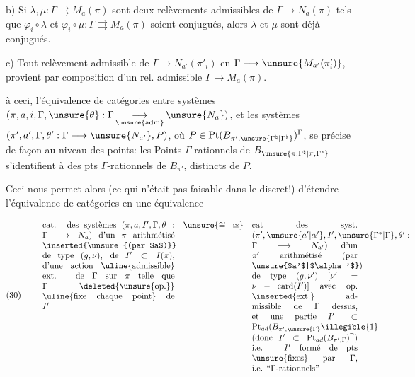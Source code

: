 b) Si $\lambda,\mu:\Gamma\rightrightarrows M_a(\pi)$ sont deux
relèvements admissibles de $\Gamma\longrightarrow N_a(\pi)$
 tels que
$\varphi_i\circ\lambda$ et $\varphi_i\circ\mu:
\Gamma\rightrightarrows M_a(\pi)$ soient
conjugués, alors $\lambda$ et $\mu$ sont déjà
\inserted{$\pi$-}conjugués.

c) Tout relèvement admissible de
$\Gamma\longrightarrow N_{a'}(\pi'_i)$ en
$\Gamma\longrightarrow \unsure{M_{a'}(\pi'_i)}$,
provient par composition d'un rel. admissible
$\Gamma\longrightarrow M_a(\pi)$.


 à ceci, l'équivalence de catégories entre systèmes
$(\pi,a,i,\Gamma,\unsure{\theta}:\Gamma\mathop{\longrightarrow}\limits_{\unsure{\mathrm{adm}}}\unsure{N_a})$,
et les systèmes $(\pi',a',\Gamma,\theta':\Gamma\longrightarrow\unsure{N_{a'}},P)$,
où $P\in\mathrm{Pt}(B_{\pi',\unsure{\Gamma^{\natural}|\Gamma^{\flat}}})^\Gamma$,
se précise de façon  au niveau des points: les
Points $\Gamma$-rationnels de $B_{\unsure{\pi,\Gamma^{\natural}|\pi,\Gamma^{\flat}}}$
s'identifient à 
 des pts $\Gamma$-rationnels
de $B_{\pi'}$, distincts de $P$.

Ceci nous permet alors (ce qui n'était pas faisable dans le 
discret!) d'étendre l'équivalence de catégories en une équivalence

\[
(30)\qquad
\begin{array}{c@{\quad}c@{\quad}c}
\parbox[t]{0.45\linewidth}{%
cat. des systèmes $(\pi,a,I',\Gamma,\theta:\Gamma\longrightarrow N_a)$
d'un $\pi$ arithmétisé \inserted{\unsure{(par $a$)}} de type $(g,\nu)$,
de $I'\subset I(\pi)$, d'une action
\uline{admissible} ext. de $\Gamma$ sur $\pi$
telle que $\Gamma$ \deleted{\unsure{op.}} \uline{fixe chaque point} de $I'$
}
& \unsure{\cong|\simeq} &
\parbox[t]{0.36\linewidth}{%
cat des syst.
$(\pi',\unsure{a'|\alpha'},I',\unsure{\Gamma^{*}|\Gamma},\theta':\Gamma\longrightarrow N_{a'})$
d'un $\pi'$ arithmétisé (par \unsure{$a'$|$\alpha'$}) de type
$(g,\nu')$ $[\nu'=\nu-\mathrm{card}(I')]$
avec op. \inserted{ext.} admissible de $\Gamma$ dessus, et
une partie $I'\subset\mathrm{Pt}_{ad}(B_{\pi',\unsure{\Gamma}}\illegible{1}$
(donc $I'\subset\mathrm{Pt}_{ad}(B_{\pi',\Gamma})^\Gamma$)
i.e. $I'$ formé de pts \unsure{fixes} par $\Gamma$, i.e. ``$\Gamma$-rationnels''
}
\end{array}
\]

